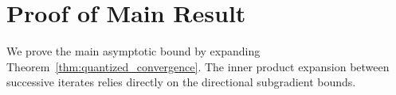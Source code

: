 \section{Proof of Main Result}
\label{sec:proof}

We prove the main asymptotic bound by expanding Theorem~\ref{thm:quantized_convergence}.
The inner product expansion between successive iterates relies directly on the directional subgradient bounds.

